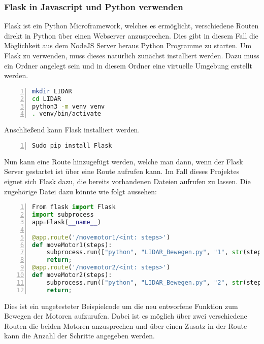 \subsubsection{Flask in Javascript und Python verwenden}
Flask ist ein Python Microframework, welches es ermöglicht, verschiedene Routen direkt in Python über einen Webserver anzusprechen. Dies gibt in diesem Fall die Möglichkeit aus dem NodeJS Server heraus Python Programme zu starten. 
Um Flask zu verwenden, muss dieses natürlich zunächst installiert werden. Dazu muss ein Ordner angelegt sein und in diesem Ordner eine virtuelle Umgebung erstellt werden. 
\begin{lstlisting}[caption={Installation Flask Schritt 1}, language={bash}, numbers=left]
mkdir LIDAR
cd LIDAR
python3 -m venv venv
. venv/bin/activate
\end{lstlisting}
Anschließend kann Flask installiert werden.
\begin{lstlisting}[caption={Installation Flask Schritt 2}, language={bash}, numbers=left]
Sudo pip install Flask
\end{lstlisting}
Nun kann eine Route hinzugefügt werden, welche man dann, wenn der Flask Server gestartet ist über eine Route aufrufen kann. 
Im Fall dieses Projektes eignet sich Flask dazu, die bereits vorhandenen Dateien aufrufen zu lassen. Die zugehörige Datei dazu könnte wie folgt aussehen:
\begin{lstlisting}[caption={Flask Beispielprogram}, language={python}, numbers=left]
From flask import Flask
import subprocess
app=Flask(__name__)

@app.route('/movemotor1/<int: steps>')
def moveMotor1(steps):
	subprocess.run(["python", "LIDAR_Bewegen.py", "1", str(steps)])
	return;
@app.route('/movemotor2/<int: steps>')
def moveMotor2(steps):
	subprocess.run(["python", "LIDAR_Bewegen.py", "2", str(steps)])
	return;

\end{lstlisting}
Dies ist ein ungetesteter Beispielcode um die neu entworfene Funktion zum Bewegen der Motoren aufzurufen. Dabei ist es möglich über zwei verschiedene Routen die beiden Motoren anzusprechen und über einen Zusatz in der Route kann die Anzahl der Schritte angegeben werden. \cite{flask}




